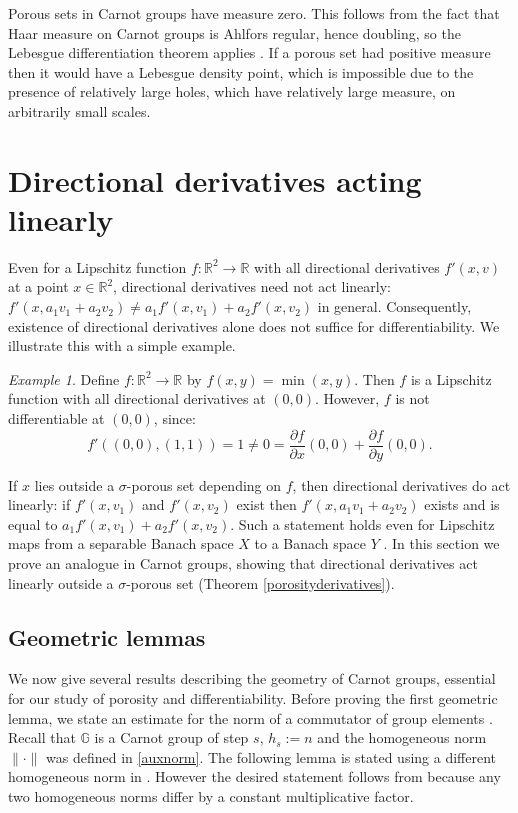 \documentclass[reqno, 11pt]{amsart}
\theoremstyle{definition}
\theoremstyle{remark}
\newtheorem{example}[theorem]{Example}
\numberwithin{theorem}{section}
\numberwithin{equation}{section}
\begin{document}
Porous sets in Carnot groups have measure zero. This follows from the fact that Haar measure on Carnot groups is Ahlfors regular, hence doubling, so the Lebesgue differentiation theorem applies \cite[Theorem 1.8]{Hei01}. If a porous set had positive measure then it would have a Lebesgue density point, which is impossible due to the presence of relatively large holes, which have relatively large measure, on arbitrarily small scales. 

\section{Directional derivatives acting linearly}

Even for a Lipschitz function $f\colon \mathbb{R}^{2}\to \mathbb{R}$ with all directional derivatives $f'(x,v)$ at a point $x\in \mathbb{R}^2$, directional derivatives need not act linearly: $f'(x,a_{1}v_{1}+a_{2}v_{2}) \neq a_{1}f'(x,v_{1})+a_{2}f'(x,v_{2})$ in general. Consequently, existence of directional derivatives alone does not suffice for differentiability. We illustrate this with a simple example.

\begin{example}\label{nonlineardd}
Define $f\colon \mathbb{R}^2 \to \mathbb{R}$ by $f(x,y)=\min (x,y)$. Then $f$ is a Lipschitz function with all directional derivatives at $(0,0)$. However, $f$ is not differentiable at $(0,0)$, since:
\[f'((0,0),(1,1))=1\neq 0=\frac{\partial f}{\partial x}(0,0)+\frac{\partial f}{\partial y}(0,0).\]
\end{example}

If $x$ lies outside a $\sigma$-porous set depending on $f$, then directional derivatives do act linearly: if $f'(x,v_{1})$ and $f'(x,v_{2})$ exist then $f'(x,a_{1}v_{1}+a_{2}v_{2})$ exists and is equal to $a_{1}f'(x,v_{1})+a_{2}f'(x,v_{2})$. Such a statement holds even for Lipschitz maps from a separable Banach space $X$ to a Banach space $Y$ \cite[Theorem 2]{PZ01}. In this section we prove an analogue in Carnot groups, showing that directional derivatives act linearly outside a $\sigma$-porous set (Theorem \ref{porosityderivatives}).

\subsection{Geometric lemmas}

We now give several results describing the geometry of Carnot groups, essential for our study of porosity and differentiability. Before proving the first geometric lemma, we state an estimate for the norm of a commutator of group elements \cite[Lemma 2.13]{FS}. Recall that $\mathbb{G}$ is a Carnot group of step $s$, $h_s:=n$ and the homogeneous norm $\|\cdot \|$ was defined in \eqref{auxnorm}. The following lemma is stated using a different homogeneous norm in \cite{FS}. However the desired statement follows from \cite[Lemma 2.13]{FS} because any two homogeneous norms differ by a constant multiplicative factor.
\end{document}

